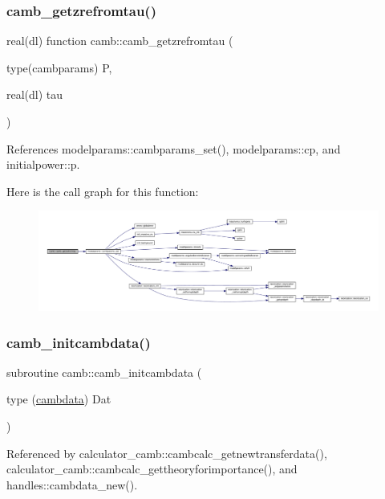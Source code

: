 \subsubsection{\texorpdfstring{camb\+\_\+getzrefromtau()}{camb\_getzrefromtau()}}
{\footnotesize\ttfamily real(dl) function camb\+::camb\+\_\+getzrefromtau (\begin{DoxyParamCaption}\item[{type(cambparams)}]{P,  }\item[{real(dl)}]{tau }\end{DoxyParamCaption})}



References modelparams\+::cambparams\+\_\+set(), modelparams\+::cp, and initialpower\+::p.

Here is the call graph for this function\+:
\nopagebreak
\begin{figure}[H]
\begin{center}
\leavevmode
\includegraphics[width=350pt]{namespacecamb_ab45910129412993d163c3d4b83e19152_cgraph}
\end{center}
\end{figure}
\mbox{\label{namespacecamb_a64195b97e1e4c42b990076ff2bff6f1d}} 
\subsubsection{\texorpdfstring{camb\+\_\+initcambdata()}{camb\_initcambdata()}}
{\footnotesize\ttfamily subroutine camb\+::camb\+\_\+initcambdata (\begin{DoxyParamCaption}\item[{type (\mbox{\hyperlink{structcamb_1_1cambdata}{cambdata}})}]{Dat }\end{DoxyParamCaption})}



Referenced by calculator\+\_\+camb\+::cambcalc\+\_\+getnewtransferdata(), calculator\+\_\+camb\+::cambcalc\+\_\+gettheoryforimportance(), and handles\+::cambdata\+\_\+new().

